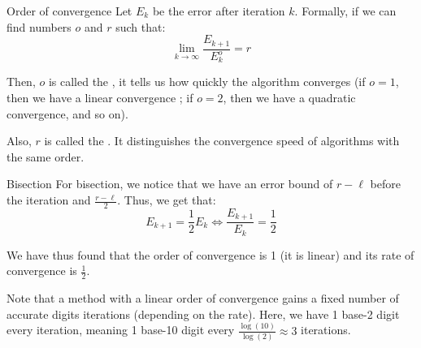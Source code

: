 \documentclass[a4paper]{article}
\begin{document}
\begin{parag}{Order of convergence}
   Let $E_k$ be the error after iteration $k$. Formally, if we can find numbers $o$ and $r$ such that: 
   \[\lim_{k \to \infty} \frac{E_{k+1}}{E_k^o} = r\]
   
   Then, $o$ is called the , it tells us how quickly the algorithm converges (if $o = 1$, then we have a linear convergence ; if $o = 2$, then we have a quadratic convergence, and so on).

   Also, $r$ is called the . It distinguishes the convergence speed of algorithms with the same order.

    \begin{subparag}{Bisection}
       For bisection, we notice that we have an error bound of $r - \ell $ before the  iteration and $\frac{r - \ell }{2}$. Thus, we get that: 
       \[E_{k+1} = \frac{1}{2} E_k \iff \frac{E_{k+1}}{E_k} = \frac{1}{2}\]
       
       We have thus found that the order of convergence is 1 (it is linear) and its rate of convergence is $\frac{1}{2}$.

       Note that a method with a linear order of convergence gains a fixed number of accurate digits iterations (depending on the rate). Here, we have 1 base-2 digit every iteration, meaning 1 base-10 digit every $\frac{\log\left(10\right)}{\log\left(2\right)} \approx 3$ iterations.
    \end{subparag}
\end{parag}
\end{document}
